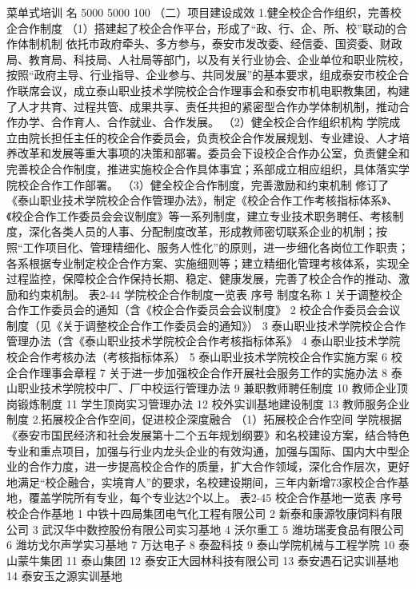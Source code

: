 菜单式培训
名
5000
5000
100%
（二）项目建设成效
1.健全校企合作组织，完善校企合作制度
（1）搭建起了校企合作平台，形成了“政、行、企、所、校”联动的合作体制机制
依托市政府牵头、多方参与，泰安市发改委、经信委、国资委、财政局、教育局、科技局、人社局等部门，以及有关行业协会、企业单位和职业院校，按照“政府主导、行业指导、企业参与、共同发展”的基本要求，组成泰安市校企合作联席会议，成立泰山职业技术学院校企合作理事会和泰安市机电职教集团，构建了人才共育、过程共管、成果共享、责任共担的紧密型合作办学体制机制，推动合作办学、合作育人、合作就业、合作发展。
（2）健全校企合作组织机构
学院成立由院长担任主任的校企合作委员会，负责校企合作发展规划、专业建设、人才培养改革和发展等重大事项的决策和部署。委员会下设校企合作办公室，负责健全和完善校企合作制度，推进实施校企合作具体事宜；系部成立相应组织，具体落实学院校企合作工作部署。
（3）健全校企合作制度，完善激励和约束机制
修订了《泰山职业技术学院校企合作管理办法》，制定《校企合作工作考核指标体系》、《校企合作工作委员会会议制度》等一系列制度，建立专业技术职务聘任、考核制度，深化各类人员的人事、分配制度改革，形成教师密切联系企业的机制；按照“工作项目化、管理精细化、服务人性化”的原则，进一步细化各岗位工作职责；各系根据专业制定校企合作方案、实施细则等；建立精细化管理考核体系，实现全过程监控，保障校企合作保持长期、稳定、健康发展，完善了校企合作的推动、激励和约束机制。
表2-44 学院校企合作制度一览表
序号
制度名称
1
关于调整校企合作工作委员会的通知（含《校企合作委员会会议制度》
2
校企合作委员会会议制度（见《关于调整校企合作工作委员会的通知》）
3
泰山职业技术学院校企合作管理办法（含《泰山职业技术学院校企合作考核指标体系》
4
泰山职业技术学院校企合作考核办法（考核指标体系）
5
泰山职业技术学院校企合作实施方案
6
校企合作理事会章程
7
关于进一步加强校企合作开展社会服务工作的实施办法
8
泰山职业技术学院校中厂、厂中校运行管理办法
9
兼职教师聘任制度
10
教师企业顶岗锻炼制度
11
学生顶岗实习管理办法
12
校外实训基地建设制度
13
教师服务企业制度
2.拓展校企合作空间，促进校企深度融合
（1）拓展校企合作空间
学院根据《泰安市国民经济和社会发展第十二个五年规划纲要》和名校建设方案，结合特色专业和重点项目，加强与行业内龙头企业的有效沟通，加强与国际、国内大中型企业的合作力度，进一步提高校企合作的质量，扩大合作领域，深化合作层次，更好地满足“校企融合，实境育人”的要求，名校建设期间，三年内新增73家校企合作基地，覆盖学院所有专业，每个专业达2个以上。
表2-45  校企合作基地一览表
序号
校企合作基地
1
中铁十四局集团电气化工程有限公司
2
新泰和康源牧康饲料有限公司
3
武汉华中数控股份有限公司实习基地
4
沃尔重工
5
潍坊瑞麦食品有限公司
6
潍坊戈尔声学实习基地
7
万达电子
8
泰盈科技
9
泰山学院机械与工程学院
10
泰山蒙牛集团
11
泰山集团
12
泰安正大园林科技有限公司
13
泰安遇石记实训基地
14
泰安玉之源实训基地
